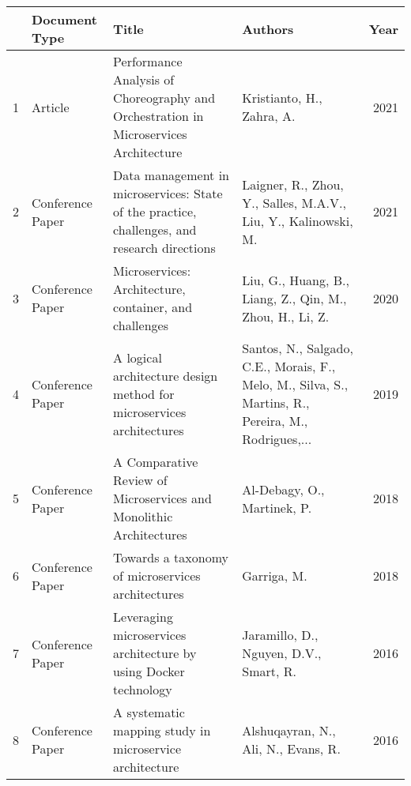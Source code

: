 \begin{table*}[!t]
    \begin{tabular}{llp{3in}p{2in}r}
        \toprule
        {} & \textbf{Document Type} & \textbf{Title}                                                                                      & \textbf{Authors}                                                                                    & \textbf{Year} \\
        \midrule
        1  & Article                & Performance Analysis of Choreography and Orchestration in Microservices Architecture                & Kristianto, H., Zahra, A.                                                                           & 2021          \\
        2  & Conference Paper       & Data management in microservices: State of the practice, challenges, and research directions        & Laigner, R., Zhou, Y., Salles, M.A.V., Liu, Y., Kalinowski, M.                                      & 2021          \\
        3  & Conference Paper       & Microservices: Architecture, container, and challenges                                              & Liu, G., Huang, B., Liang, Z., Qin, M., Zhou, H., Li, Z.                                            & 2020          \\
        4  & Conference Paper       & A logical architecture design method for microservices architectures                                & Santos, N., Salgado, C.E., Morais, F., Melo, M., Silva, S., Martins, R., Pereira, M., Rodrigues,... & 2019          \\
        5  & Conference Paper       & A Comparative Review of Microservices and Monolithic Architectures                                  & Al-Debagy, O., Martinek, P.                                                                         & 2018          \\
        6  & Conference Paper       & Towards a taxonomy of microservices architectures                                                   & Garriga, M.                                                                                         & 2018          \\
        7  & Conference Paper       & Leveraging microservices architecture by using Docker technology                                    & Jaramillo, D., Nguyen, D.V., Smart, R.                                                              & 2016          \\
        8  & Conference Paper       & A systematic mapping study in microservice architecture                                             & Alshuqayran, N., Ali, N., Evans, R.                                                                 & 2016          \\

\end{tabular}
\end{table*}
